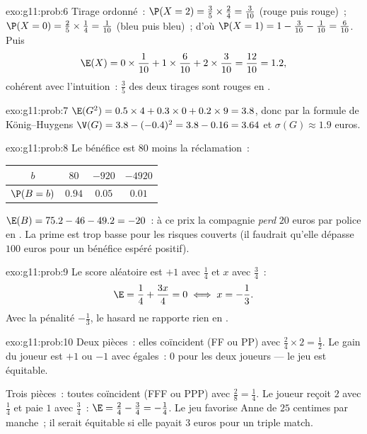 \begin{solution}{exo:g11:prob:6}
Tirage ordonné~: $\P(X = 2) = \frac35 \times \frac24 = \frac{3}{10}$
(rouge puis rouge)~; $\P(X = 0) = \frac25 \times \frac14 =
\frac{1}{10}$ (bleu puis bleu)~; d'où
$\P(X = 1) = 1 - \frac{3}{10} - \frac{1}{10} = \frac{6}{10}$. Puis
\[
\E(X) = 0 \times \frac1{10} + 1 \times \frac6{10} + 2 \times \frac3{10}
= \frac{12}{10} = 1.2 ,
\]
cohérent avec l'intuition~: $\frac35$ des deux tirages sont rouges en
.
\end{solution}

\begin{solution}{exo:g11:prob:7}
$\E(G^2) = 0.5 \times 4 + 0.3 \times 0 + 0.2 \times 9 = 3.8$, donc par
la formule de König--Huygens
$\V(G) = 3.8 - (-0.4)^2 = 3.8 - 0.16 = 3.64$ et
$\sigma(G) \approx 1.9$ euros.
\end{solution}

\begin{solution}{exo:g11:prob:8}
Le bénéfice est $80$ moins la réclamation~:
\begin{center}
\begin{tabular}{c|ccc}
$b$ & $80$ & $-920$ & $-4920$\\
\hline
$\P(B=b)$ & $0.94$ & $0.05$ & $0.01$
\end{tabular}
\end{center}
$\E(B) = 75.2 - 46 - 49.2 = -20$~: à ce prix la compagnie \emph{perd}
$20$ euros par police en . La prime est trop basse pour les
risques couverts (il faudrait qu'elle dépasse $100$ euros pour un
bénéfice espéré positif).
\end{solution}

\begin{solution}{exo:g11:prob:9}
Le score aléatoire est $+1$ avec  $\frac14$ et $x$ avec
 $\frac34$~:
\[
\E = \frac14 + \frac{3x}{4} = 0 \iff x = -\frac13 .
\]
Avec la pénalité $-\frac13$, le hasard ne rapporte rien en .
\end{solution}

\begin{solution}{exo:g11:prob:10}
Deux pièces~: elles coïncident (FF ou PP) avec 
$\frac24 \times 2 = \frac12$. Le gain du joueur est $+1$ ou $-1$ avec
 égales~:  $0$ pour les deux joueurs --- le jeu est
équitable.

Trois pièces~: toutes coïncident (FFF ou PPP) avec 
$\frac{2}{8} = \frac14$. Le joueur reçoit $2$ avec 
$\frac14$ et paie $1$ avec  $\frac34$~:
$\E = \frac24 - \frac34 = -\frac14$. Le jeu favorise Anne de $25$
centimes par manche~; il serait équitable si elle payait $3$ euros pour
un triple match.
\end{solution}

